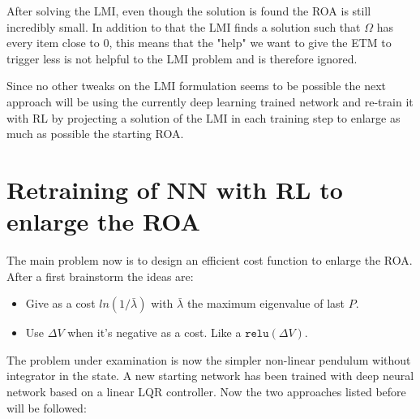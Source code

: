 \documentclass{article}
\begin{document}
After solving the LMI, even though the solution is found the ROA is still incredibly small. In addition to that the LMI finds a solution such that $\Omega$ has every item close to 0, this means that the "help" we want to give the ETM to trigger less is not helpful to the LMI problem and is therefore ignored. 

Since no other tweaks on the LMI formulation seems to be possible the next approach will be using the currently deep learning trained network and re-train it with RL by projecting a solution of the LMI in each training step to enlarge as much as possible the starting ROA. 

\section*{Retraining of NN with RL to enlarge the ROA}
The main problem now is to design an efficient cost function to enlarge the ROA. After a first brainstorm the ideas are:
\begin{itemize}
  \item Give as a cost $ln(1/\bar{\lambda})$ with $\bar{\lambda}$ the maximum eigenvalue of last $P$. 
  \item Use $\Delta V$ when it's negative as a cost. Like a $\texttt{relu}(\Delta V)$.
\end{itemize}

The problem under examination is now the simpler non-linear pendulum without integrator in the state. A new starting network has been trained with deep neural network based on a linear LQR controller. Now the two approaches listed before will be followed:
\end{document}
